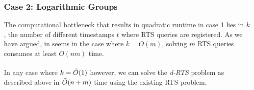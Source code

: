 \documentclass{article}
\begin{document}
\subsubsection*{Case 2: Logarithmic Groups}
The computational bottleneck that results in quadratic runtime in case 1 lies in $k$, the number of different timestamps $t$ where RTS queries are registered. As we have argued, in seems in the case where $k = O(m)$, solving $m$ RTS queries consumes at least $O(nm)$ time. \\
\\
In any case where $k = \Tilde{O}(1)$ however, we can solve the \textit{d-RTS} problem as described above in $\Tilde{O}(n+m)$ time using the existing RTS problem.
\end{document}
